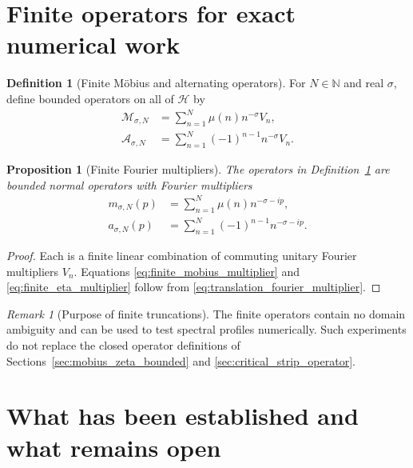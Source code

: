 \documentclass[11pt]{amsart}
\numberwithin{equation}{section}
\theoremstyle{plain}
\newtheorem{proposition}[theorem]{Proposition}
\theoremstyle{definition}
\newtheorem{definition}[theorem]{Definition}
\theoremstyle{remark}
\newtheorem{remark}[theorem]{Remark}
\newcommand{\N}{\mathbb{N}}
\newcommand{\Hil}{\mathcal{H}}
\begin{document}
\section{Finite operators for exact numerical work}
\label{sec:finite_numerics}

\begin{definition}[Finite M\"obius and alternating operators]
\label{def:finite_operators}
For $N\in\N$ and real $\sigma$, define bounded operators on all of $\Hil$ by
\begin{align}
\mathcal M_{\sigma,N}
&=\sum_{n=1}^{N}\mu(n)n^{-\sigma}V_n,
\label{eq:finite_mobius_operator}\\
\mathcal A_{\sigma,N}
&=\sum_{n=1}^{N}(-1)^{n-1}n^{-\sigma}V_n.
\label{eq:finite_alternating_operator}
\end{align}
\end{definition}

\begin{proposition}[Finite Fourier multipliers]
\label{prop:finite_multiplier_form}
The operators in Definition~\ref{def:finite_operators} are bounded normal
operators with Fourier multipliers
\begin{align}
m_{\sigma,N}(p)
&=\sum_{n=1}^{N}\mu(n)n^{-\sigma-ip},
\label{eq:finite_mobius_multiplier}\\
a_{\sigma,N}(p)
&=\sum_{n=1}^{N}(-1)^{n-1}n^{-\sigma-ip}.
\label{eq:finite_eta_multiplier}
\end{align}
\end{proposition}

\begin{proof}
Each is a finite linear combination of commuting unitary Fourier
multipliers $V_n$.  Equations \eqref{eq:finite_mobius_multiplier} and
\eqref{eq:finite_eta_multiplier} follow from
\eqref{eq:translation_fourier_multiplier}.
\end{proof}

\begin{remark}[Purpose of finite truncations]
\label{rem:finite_truncations_purpose}
The finite operators contain no domain ambiguity and can be used to test
spectral profiles numerically.  Such experiments do not replace the closed
operator definitions of Sections~\ref{sec:mobius_zeta_bounded} and
\ref{sec:critical_strip_operator}.
\end{remark}

\section{What has been established and what remains open}
\label{sec:open_questions}
\end{document}
